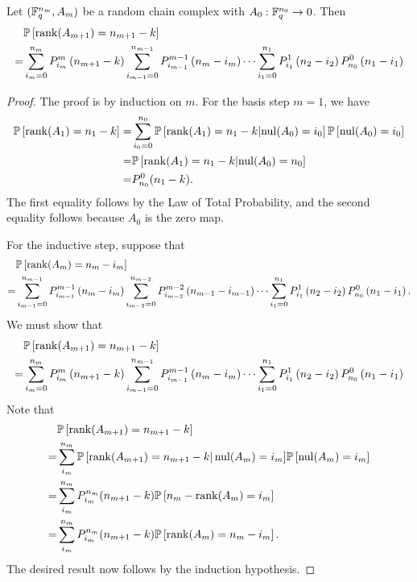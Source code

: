 \begin{lemma}\label{lemProbranks}
Let $(\mathbb{F}_q^{n_m}, A_m)$ be a random chain complex with $A_0:\mathbb{F}_q^{n_0}\to 0$.  Then
\begin{align*}
 &  \mathbb{P}\left[\operatorname{\mathrm{rank}}(A_{m+1}) = n_{m+1} - k\right]\\
=& 	\sum_{i_m=0}^{n_m} P_{i_m}^{m}\left(n_{m+1} -k\right)
	\sum_{i_{m-1}=0}^{n_{m-1}} P_{i_{m-1}}^{m-1}\left(n_m - i_m\right)
		\cdots
	\sum_{i_1 = 0}^{n_1} P_{i_1}^1\left(n_2 - i_2\right) P_{n_0}^0 \left(n_1 - i_1\right) 
\end{align*}
\end{lemma}
\begin{proof}
The proof is by induction on $m$. For the basis step $m=1$, we have
\begin{align*}
\mathbb{P}\left[\operatorname{\mathrm{rank}}(A_1) = n_1 - k\right]
	=& \sum_{i_0=0}^{n_0}\mathbb{P}\left [\operatorname{\mathrm{rank}}(A_1)= n_1 - k|\mathrm{nul} (A_0) = i_0\right]
		\mathbb{P}\left[\mathrm{nul}(A_0) = i_0 \right]\\
	=& \mathbb{P}\left [\operatorname{\mathrm{rank}}(A_1)= n_1 - k|\mathrm{nul} (A_0) = n_0\right]\\
	=& P_{n_0}^0(n_1 - k).
\end{align*}
The first equality follows by the Law of Total Probability, and the second equality follows because $A_0$ is the zero map.

For the inductive step, suppose that
\begin{align*}
 &  \mathbb{P}\left[\operatorname{\mathrm{rank}}(A_{m}) = n_{m} - i_{m}\right]\\
=& 	\sum_{i_{m-1}=0}^{n_{m-1}} P_{i_{m-1}}^{m-1}\left(n_{m} -i_{m}\right)
	\sum_{i_{m-2}=0}^{n_{m-2}} P_{i_{m-2}}^{m-2}\left(n_{m-1} - i_{m-1}\right)
		\cdots
	\sum_{i_1 = 0}^{n_1} P_{i_1}^1\left(n_2 - i_2\right) P_{n_0}^0 \left(n_1 - i_1\right).
\end{align*}
We must show that
\begin{align*}
 &  \mathbb{P}\left[\operatorname{\mathrm{rank}}(A_{m+1}) = n_{m+1} - k\right]\\
=& 	\sum_{i_m=0}^{n_m} P_{i_m}^{m}\left(n_{m+1} -k\right)
	\sum_{i_{m-1}=0}^{n_{m-1}} P_{i_{m-1}}^{m-1}\left(n_m - i_m\right)
		\cdots
	\sum_{i_1 = 0}^{n_1} P_{i_1}^1\left(n_2 - i_2\right) P_{n_0}^0 \left(n_1 - i_1\right) 
\end{align*}
Note that
\begin{align*}
 &	\mathbb{P}\left[\operatorname{\mathrm{rank}}(A_{m+1}) = n_{m+1} - k\right]\\
=& 	\sum_{i_{m}}^{n_{m}} \mathbb{P}\left[ \operatorname{\mathrm{rank}}(A_{m+1}) = n_{m+1} - k  \right|\mathrm{nul}(A_m) = i_m]
		\mathbb{P}\left[\mathrm{nul}(A_m) = i_m\right]\\
=&  \sum_{i_{m}}^{n_{m}} P_{i_m}^{n_m}(n_{m+1} - k)
		\mathbb{P}\left[n_m - \operatorname{\mathrm{rank}}(A_m) = i_m\right]\\
=&	\sum_{i_{m}}^{n_{m}} P_{i_m}^{n_m}(n_{m+1} - k)
		\mathbb{P}\left[\operatorname{\mathrm{rank}}(A_m) = n_m- i_m\right].\\
\end{align*}
The desired result now follows by the induction hypothesis.
\end{proof}

